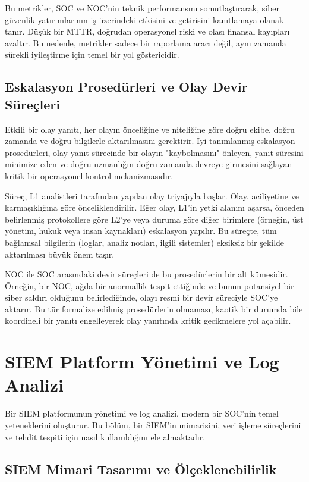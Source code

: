 Bu metrikler, SOC ve NOC'nin teknik performansını somutlaştırarak, siber güvenlik yatırımlarının iş üzerindeki etkisini ve getirisini kanıtlamaya olanak tanır. Düşük bir MTTR, doğrudan operasyonel riski ve olası finansal kayıpları azaltır. Bu nedenle, metrikler sadece bir raporlama aracı değil, aynı zamanda sürekli iyileştirme için temel bir yol göstericidir.

\subsection{Eskalasyon Prosedürleri ve Olay Devir Süreçleri}

Etkili bir olay yanıtı, her olayın önceliğine ve niteliğine göre doğru ekibe, doğru zamanda ve doğru bilgilerle aktarılmasını gerektirir. İyi tanımlanmış eskalasyon prosedürleri, olay yanıt sürecinde bir olayın "kaybolmasını" önleyen, yanıt süresini minimize eden ve doğru uzmanlığın doğru zamanda devreye girmesini sağlayan kritik bir operasyonel kontrol mekanizmasıdır.

Süreç, L1 analistleri tarafından yapılan olay triyajıyla başlar. Olay, aciliyetine ve karmaşıklığına göre önceliklendirilir. Eğer olay, L1'in yetki alanını aşarsa, önceden belirlenmiş protokollere göre L2'ye veya duruma göre diğer birimlere (örneğin, üst yönetim, hukuk veya insan kaynakları) eskalasyon yapılır. Bu süreçte, tüm bağlamsal bilgilerin (loglar, analiz notları, ilgili sistemler) eksiksiz bir şekilde aktarılması büyük önem taşır.

NOC ile SOC arasındaki devir süreçleri de bu prosedürlerin bir alt kümesidir. Örneğin, bir NOC, ağda bir anormallik tespit ettiğinde ve bunun potansiyel bir siber saldırı olduğunu belirlediğinde, olayı resmi bir devir süreciyle SOC'ye aktarır. Bu tür formalize edilmiş prosedürlerin olmaması, kaotik bir durumda bile koordineli bir yanıtı engelleyerek olay yanıtında kritik gecikmelere yol açabilir.

\section{SIEM Platform Yönetimi ve Log Analizi}

Bir SIEM platformunun yönetimi ve log analizi, modern bir SOC'nin temel yeteneklerini oluşturur. Bu bölüm, bir SIEM'in mimarisini, veri işleme süreçlerini ve tehdit tespiti için nasıl kullanıldığını ele almaktadır.

\subsection{SIEM Mimari Tasarımı ve Ölçeklenebilirlik}

